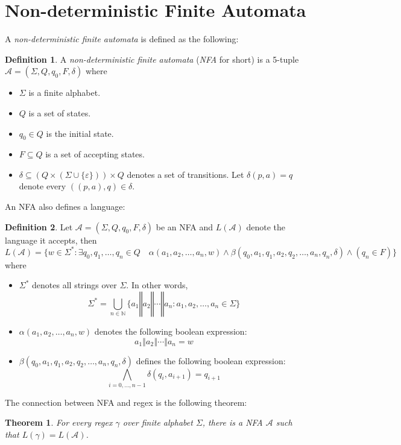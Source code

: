 \documentclass[titlepage]{article}
\theoremstyle{plain}
\newtheorem*{theorem}{Theorem}
\theoremstyle{definition}
\newtheorem*{definition}{Definition}
\theoremstyle{remark}
\begin{document}
\section{Non-deterministic Finite Automata}
A \textit{non-deterministic finite automata} is defined as the following:
\begin{definition}
  A \textit{non-deterministic finite automata} (\textit{NFA} for short) is
  a 5-tuple $\mathcal{A}=(\Sigma,Q,q_0,F,\delta)$ where
  \begin{itemize}
    \item $\Sigma$ is a finite alphabet.
    \item $Q$ is a set of states.
    \item $q_0\in Q$ is the initial state.
    \item $F\subseteq Q$ is a set of accepting states.
    \item $\delta\subseteq (Q\times(\Sigma\cup\{\varepsilon\}))\times Q$ denotes
      a set of transitions. Let $\delta(p,a)=q$ denote every $((p,a),q)\in
      \delta$.
  \end{itemize}
\end{definition}
An NFA also defines a language:
\begin{definition}
  Let $\mathcal{A}=(\Sigma,Q,q_0,F,\delta)$ be an NFA and $L(\mathcal{A})$
  denote the language it accepts, then
  \[
    L(\mathcal{A})=\{w\in\Sigma^*: \exists q_0,q_1,\ldots,q_n\in Q\quad
    \alpha(a_1,a_2,\ldots,a_n,w)\land
    \beta(q_0,a_1,q_1,a_2,q_2,\ldots,a_n,q_n,\delta)\land
    (q_n\in F)\}
  \]
  where
  \begin{itemize}
    \item $\Sigma^*$ denotes all strings over $\Sigma$. In other words,
      \[
        \Sigma^*=\bigcup_{n\in\mathds{N}}
        \{a_1\mathbin\Vert a_2\mathbin\Vert\cdots\mathbin\Vert a_n:
        a_1,a_2,\ldots,a_n\in\Sigma\}
      \]
    \item $\alpha(a_1,a_2,\ldots,a_n,w)$ denotes the following boolean
      expression:
      \[
        a_1\mathbin\Vert a_2\mathbin\Vert\cdots\mathbin\Vert a_n=w
      \]
    \item $\beta(q_0,a_1,q_1,a_2,q_2,\ldots,a_n,q_n,\delta)$ defines the following
      boolean expression:
      \[
        \bigwedge_{i=0,\ldots,n-1}\delta(q_i,a_{i+1})=q_{i+1}
      \]
  \end{itemize}
\end{definition}
The connection between NFA and regex is the following theorem:
\begin{theorem}
  For every regex $\gamma$ over finite alphabet $\Sigma$, there is a NFA
  $\mathcal{A}$ such that $L(\gamma)=L(\mathcal{A})$.
\end{theorem}
\end{document}
